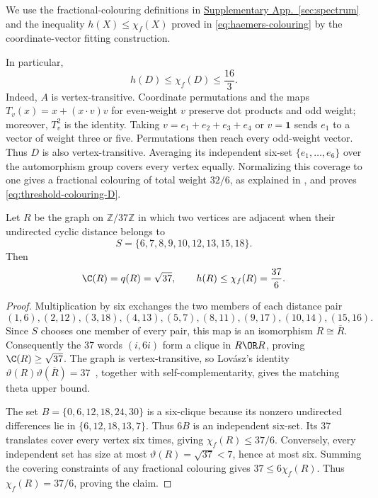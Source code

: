 We use the fractional-colouring definitions in
\hyperref[def:fractional-colouring]{Supplementary App.~\ref*{sec:spectrum}}
and the inequality $h(X)\le\chi_f(X)$ proved in
\eqref{eq:haemers-colouring} by the coordinate-vector fitting construction.

In particular,
\begin{equation}\label{eq:threshold-colouring-D}
 h(D)\le\chi_f(D)\le\frac{16}{3}.
\end{equation}
Indeed, $A$ is vertex-transitive. Coordinate permutations and the maps
$T_v(x)=x+(x\cdot v)v$ for even-weight $v$ preserve dot products
and odd weight; moreover, $T_v^2$ is the identity. Taking
$v=e_1+e_2+e_3+e_4$ or $v=\mathbf1$ sends $e_1$ to a vector of
weight three or five. Permutations then reach every odd-weight vector.
Thus $D$ is also vertex-transitive. Averaging its independent six-set
$\{e_1,\ldots,e_6\}$ over the automorphism group covers every vertex
equally. Normalizing this coverage to one gives a fractional colouring
of total weight $32/6$, as explained in , and proves
\eqref{eq:threshold-colouring-D}.

\begin{lemma}\label{lem:circulant37}
Let $R$ be the graph on $\mathbb Z/37\mathbb Z$ in which two vertices
are adjacent when their undirected cyclic distance belongs to
\[
 S=\{6,7,8,9,10,12,13,15,18\}.
\]
Then
\[
 \C(R)=q(R)=\sqrt{37},\qquad h(R)\le\chi_f(R)=\frac{37}{6}.
\]
\end{lemma}
\begin{proof}
Multiplication by six exchanges the two members of each distance pair
\[
 (1,6),(2,12),(3,18),(4,13),(5,7),
 (8,11),(9,17),(10,14),(15,16).
\]
Since $S$ chooses one member of every pair, this map is an isomorphism
$R\cong\overline R$. Consequently the 37 words $(i,6i)$ form a clique
in $R\OR R$, proving $\C(R)\ge\sqrt{37}$. The graph is
vertex-transitive, so Lov\'asz's identity
$\vartheta(R)\vartheta(\overline R)=37$~\cite{Lovasz}, together with
self-complementarity, gives the matching theta upper bound.

The set $B=\{0,6,12,18,24,30\}$ is a six-clique because its nonzero
undirected differences lie in $\{6,12,18,13,7\}$. Thus $6B$ is an
independent six-set. Its 37 translates cover every vertex six times,
giving $\chi_f(R)\le37/6$. Conversely, every independent set has
size at most $\vartheta(R)=\sqrt{37}<7$, hence at most six. Summing
the covering constraints of any fractional colouring gives
$37\le6\chi_f(R)$. Thus $\chi_f(R)=37/6$, proving the claim.
\end{proof}


